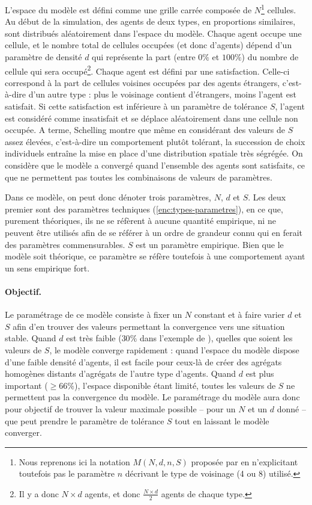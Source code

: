 L'espace du modèle est défini comme une grille carrée composée de $N$\footnote{Nous reprenons ici la notation $M(N, d, n, S)$ proposée par \autocite[433]{daude_comparaison_2006} en n'explicitant toutefois pas le paramètre $n$ décrivant le type de voisinage (4 ou 8) utilisé.} cellules.
Au début de la simulation, des agents de deux types, en proportions similaires, sont distribués aléatoirement dans l'espace du modèle. Chaque agent occupe une cellule, et le nombre total de cellules occupées (et donc d'agents) dépend d'un paramètre de densité $d$ qui représente la part (entre $0\%$ et $100\%$) du nombre de cellule qui sera occupé\footnote{Il y a donc $N \times d$ agents, et donc $\frac{N \times d}{2}$ agents de chaque type.}.
Chaque agent est défini par une satisfaction. Celle-ci correspond à la part de cellules voisines occupées par des agents \og étrangers\fg{}, c'est-à-dire d'un autre type : plus le voisinage contient d'étrangers, moins l'agent est satisfait.
Si cette satisfaction est inférieure à un paramètre de tolérance $S$, l'agent est considéré comme insatisfait et se déplace aléatoirement dans une cellule non occupée.
A terme, Schelling montre que même en considérant des valeurs de $S$ assez élevées, c'est-à-dire un comportement plutôt tolérant, la succession de choix individuels entraîne la mise en place d'une distribution spatiale très ségrégée.
On considère que le modèle a convergé quand l'ensemble des agents sont satisfaits, ce que ne permettent pas toutes les combinaisons de valeurs de paramètres.

Dans ce modèle, on peut donc dénoter trois paramètres, $N$, $d$ et $S$.
Les deux premier sont des paramètres techniques (\cref{enc:types-parametres}), en ce que, purement théoriques, ils ne se réfèrent à aucune quantité empirique, ni ne peuvent être utilisés afin de se référer à un ordre de grandeur connu qui en ferait des paramètres commensurables.
$S$ est un paramètre empirique.
Bien que le modèle soit théorique, ce paramètre se réfère toutefois à une comportement ayant un sens empirique fort.

\paragraph{Objectif.}
Le paramétrage de ce modèle consiste à fixer un $N$ constant et à faire varier $d$ et $S$ afin d'en trouver des valeurs permettant la convergence vers une situation stable.
Quand $d$ est très faible ($30\%$ dans l'exemple de \autocite{daude_comparaison_2006}), quelles que soient les valeurs de $S$, le modèle converge rapidement :
	quand l'espace du modèle dispose d'une faible densité d'agents, il est facile pour ceux-là de créer des agrégats homogènes distants d'agrégats de l'autre type d'agents.
Quand $d$ est plus important ($\geq66\%$), l'espace disponible étant limité, toutes les valeurs de $S$ ne permettent pas la convergence du modèle.
Le paramétrage du modèle aura donc pour objectif de trouver la valeur maximale possible -- pour un $N$ et un $d$ donné -- que peut prendre le paramètre de tolérance $S$ tout en laissant le modèle converger.

